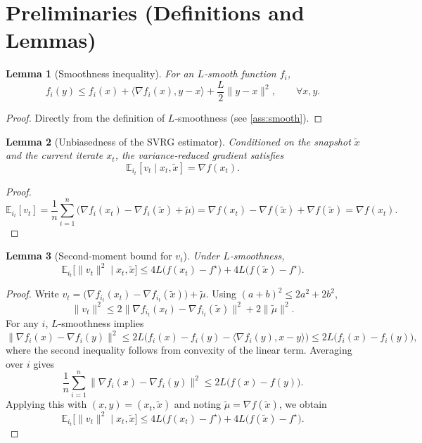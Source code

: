 \documentclass{article}
\newtheorem{lemma}{Lemma}
\newcommand{\E}{\mathbb{E}}
\begin{document}
\section*{Preliminaries (Definitions and Lemmas)}
\begin{lemma}[Smoothness inequality]\label{lem:smooth}
For an $L$‑smooth function $f_i$,
\[
f_i(y)\le f_i(x)+\langle\nabla f_i(x),y-x\rangle+\frac{L}{2}\|y-x\|^{2},\qquad\forall x,y.
\tag{L1}
\]
\end{lemma}
\begin{proof}
Directly from the definition of $L$‑smoothness (see \ref{ass:smooth}). \qedhere
\end{proof}

\begin{lemma}[Unbiasedness of the SVRG estimator]\label{lem:unbiased}
Conditioned on the snapshot $\tilde{x}$ and the current iterate $x_t$, the variance‑reduced gradient satisfies
\[
\E_{i_t}[v_t\mid x_t,\tilde{x}]=\nabla f(x_t).
\tag{L2}
\]
\end{lemma}
\begin{proof}
\[
\E_{i_t}[v_t]=\frac{1}{n}\sum_{i=1}^{n}
\bigl(\nabla f_i(x_t)-\nabla f_i(\tilde{x})+\tilde{\mu}\bigr)
= \nabla f(x_t)-\nabla f(\tilde{x})+\nabla f(\tilde{x})
= \nabla f(x_t).
\] \qedhere
\end{proof}

\begin{lemma}[Second‑moment bound for $v_t$]\label{lem:variance}
Under $L$‑smoothness,
\[
\E_{i_t}\bigl[\|v_t\|^{2}\mid x_t,\tilde{x}\bigr]
\le 4L\bigl(f(x_t)-f^{\star}\bigr)+4L\bigl(f(\tilde{x})-f^{\star}\bigr).
\tag{L3}
\]
\end{lemma}
\begin{proof}
Write $v_t=\bigl(\nabla f_{i_t}(x_t)-\nabla f_{i_t}(\tilde{x})\bigr)+\tilde{\mu}$.
Using $(a+b)^2\le 2a^2+2b^2$,
\[
\|v_t\|^{2}\le 2\|\nabla f_{i_t}(x_t)-\nabla f_{i_t}(\tilde{x})\|^{2}+2\|\tilde{\mu}\|^{2}.
\]
For any $i$, $L$‑smoothness implies
\[
\|\nabla f_i(x)-\nabla f_i(y)\|^{2}\le 2L\bigl(f_i(x)-f_i(y)-\langle\nabla f_i(y),x-y\rangle\bigr)
\le 2L\bigl(f_i(x)-f_i(y)\bigr),
\]
where the second inequality follows from convexity of the linear term.
Averaging over $i$ gives
\[
\frac{1}{n}\sum_{i=1}^{n}\|\nabla f_i(x)-\nabla f_i(y)\|^{2}
\le 2L\bigl(f(x)-f(y)\bigr).
\]
Applying this with $(x,y)=(x_t,\tilde{x})$ and noting $\tilde{\mu}=\nabla f(\tilde{x})$, we obtain
\[
\E_{i_t}\bigl[\|v_t\|^{2}\mid x_t,\tilde{x}\bigr]
\le 4L\bigl(f(x_t)-f^{\star}\bigr)+4L\bigl(f(\tilde{x})-f^{\star}\bigr).
\] \qedhere
\end{proof}
\end{document}
